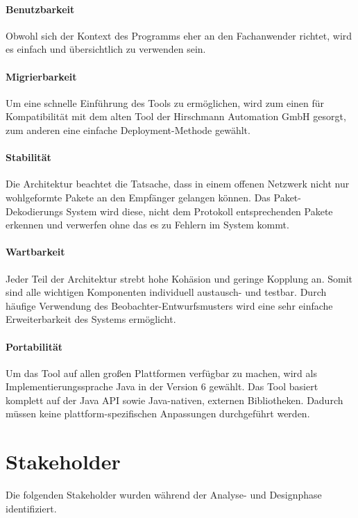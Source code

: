 \paragraph{Benutzbarkeit} Obwohl sich der Kontext des Programms eher an den
Fachanwender richtet, wird es einfach und übersichtlich zu verwenden sein.

\paragraph{Migrierbarkeit} Um eine schnelle Einführung des Tools zu ermöglichen,
wird zum einen für Kompatibilität mit dem alten Tool der Hirschmann Automation
GmbH gesorgt, zum anderen eine einfache Deployment-Methode gewählt.

\paragraph{Stabilität} Die Architektur beachtet die Tatsache, dass in einem
offenen Netzwerk nicht nur wohlgeformte Pakete an den Empfänger gelangen können.
Das Paket-Dekodierungs System wird diese, nicht dem Protokoll
entsprechenden Pakete erkennen und verwerfen ohne das es zu Fehlern im System
kommt.

\paragraph{Wartbarkeit} Jeder Teil der Architektur strebt hohe
Kohäsion und geringe Kopplung an. Somit sind alle wichtigen Komponenten
individuell austausch- und testbar. Durch häufige Verwendung des
Beobachter-Entwurfsmusters wird eine sehr einfache Erweiterbarkeit des Systems
ermöglicht.

\paragraph{Portabilität} Um das Tool auf allen großen Plattformen verfügbar zu
machen, wird als Implementierungssprache Java in der Version 6 gewählt. Das Tool
basiert komplett auf der Java API sowie Java-nativen, externen Bibliotheken.
Dadurch müssen keine plattform-spezifischen Anpassungen durchgeführt werden.

\clearpage

\section{Stakeholder}
\label{sec:1:stake}

Die folgenden Stakeholder wurden während der Analyse- und Designphase
identifiziert.

